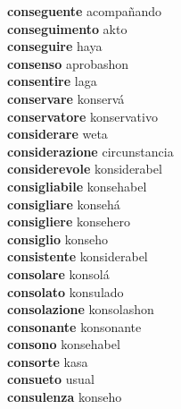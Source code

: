 \textbf{conseguente } acompañando \\
\textbf{conseguimento } akto \\
\textbf{conseguire } haya \\
\textbf{consenso } aprobashon \\
\textbf{consentire } laga \\
\textbf{conservare } konservá \\
\textbf{conservatore } konservativo \\
\textbf{considerare } weta \\
\textbf{considerazione } circunstancia \\
\textbf{considerevole } konsiderabel \\
\textbf{consigliabile } konsehabel \\
\textbf{consigliare } konsehá \\
\textbf{consigliere } konsehero \\
\textbf{consiglio } konseho \\
\textbf{consistente } konsiderabel \\
\textbf{consolare } konsolá \\
\textbf{consolato } konsulado \\
\textbf{consolazione } konsolashon \\
\textbf{consonante } konsonante \\
\textbf{consono } konsehabel \\
\textbf{consorte } kasa \\
\textbf{consueto } usual \\
\textbf{consulenza } konseho \\
